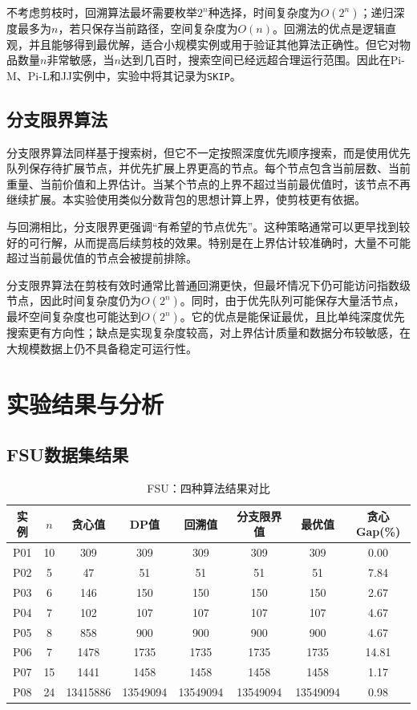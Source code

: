 \documentclass[10.5pt,a4paper,fontset=none]{ctexart}
\begin{document}
不考虑剪枝时，回溯算法最坏需要枚举$2^n$种选择，时间复杂度为$O(2^n)$；递归深度最多为$n$，若只保存当前路径，空间复杂度为$O(n)$。回溯法的优点是逻辑直观，并且能够得到最优解，适合小规模实例或用于验证其他算法正确性。但它对物品数量$n$非常敏感，当$n$达到几百时，搜索空间已经远超合理运行范围。因此在Pi-M、Pi-L和JJ实例中，实验中将其记录为\texttt{SKIP}。

\subsection{分支限界算法}

分支限界算法同样基于搜索树，但它不一定按照深度优先顺序搜索，而是使用优先队列保存待扩展节点，并优先扩展上界更高的节点。每个节点包含当前层数、当前重量、当前价值和上界估计。当某个节点的上界不超过当前最优值时，该节点不再继续扩展。本实验使用类似分数背包的思想计算上界，使剪枝更有依据。

与回溯相比，分支限界更强调“有希望的节点优先”。这种策略通常可以更早找到较好的可行解，从而提高后续剪枝的效果。特别是在上界估计较准确时，大量不可能超过当前最优值的节点会被提前排除。

分支限界算法在剪枝有效时通常比普通回溯更快，但最坏情况下仍可能访问指数级节点，因此时间复杂度仍为$O(2^n)$。同时，由于优先队列可能保存大量活节点，最坏空间复杂度也可能达到$O(2^n)$。它的优点是能保证最优，且比单纯深度优先搜索更有方向性；缺点是实现复杂度较高，对上界估计质量和数据分布较敏感，在大规模数据上仍不具备稳定可运行性。


\FloatBarrier
{}
\section{实验结果与分析}

\subsection{FSU数据集结果}

\begin{table}[!htbp]
\centering
\footnotesize
\caption{FSU：四种算法结果对比}
\begin{tabular}{cccccccc}
\toprule
实例 & $n$ & 贪心值 & DP值 & 回溯值 & 分支限界值 & 最优值 & 贪心Gap(\%) \\
\midrule
P01 & 10 & 309 & 309 & 309 & 309 & 309 & 0.00 \\
P02 & 5 & 47 & 51 & 51 & 51 & 51 & 7.84 \\
P03 & 6 & 146 & 150 & 150 & 150 & 150 & 2.67 \\
P04 & 7 & 102 & 107 & 107 & 107 & 107 & 4.67 \\
P05 & 8 & 858 & 900 & 900 & 900 & 900 & 4.67 \\
P06 & 7 & 1478 & 1735 & 1735 & 1735 & 1735 & 14.81 \\
P07 & 15 & 1441 & 1458 & 1458 & 1458 & 1458 & 1.17 \\
P08 & 24 & 13415886 & 13549094 & 13549094 & 13549094 & 13549094 & 0.98 \\
\bottomrule
\end{tabular}
\end{table}
\end{document}
